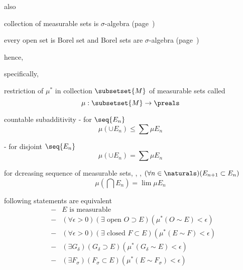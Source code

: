 \documentclass[17pt,landscape]{foils}
\begin{document}
{{	\vvitem also
	\bit
		\item collection of measurable sets is $\sigma$-algebra (page~\pageref{page:measurable-sets})
		\item every open set is Borel set and Borel sets are $\sigma$-algebra (page~\pageref{page:borel-algebra})
	\eit

	\vitem hence, %

	\vvitem specifically, 
\eit



\bit
	\item restriction of $\mu^\ast$ in collection $\subsetset{M}$ of measurable sets called %
	\[
		\mu:\subsetset{M}\to\preals
	\]

	\vitem countable subadditivity - for $\seq{E_n}$%
	\[
		\mu (\cup E_n) \leq \sum \mu E_n
	\]

	\vitem {} - for disjoint $\seq{E_n}$
	\[
		\mu (\cup E_n) = \sum \mu E_n
	\]

	\vitem for dcreasing sequence of measurable sets, ,
		\ie, $(\forall n\in\naturals)(E_{n+1} \subset E_n)$
	\[
		\mu\left(
			\bigcap E_n
		\right)
		=
		\lim
		\mu E_n
	\]
\eit


%
%

\bit
	\item following statements are equivalent
	\begin{eqnarray*}
		&-&
		E \mbox{ is measurable}
		\\
		&-&
			(\forall \epsilon >0)
			(\exists \mbox{ open } O\supset E)
			(\mu^\ast(O\sim E)<\epsilon)
		\\
		&-&
			(\forall \epsilon >0)
			(\exists \mbox{ closed } F\subset E)
			(\mu^\ast(E\sim F)<\epsilon)
		\\
		&-&
			(\exists G_\delta)
			(G_\delta \supset E)
			(\mu^\ast(G_\delta\sim E)<\epsilon)
		\\
		&-&
			(\exists F_\sigma)
			(F_\sigma \subset E)
			(\mu^\ast(E\sim F_\sigma)<\epsilon)
	\end{eqnarray*}

}}
\end{document}
